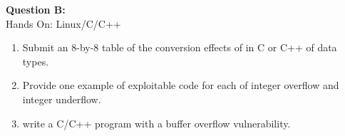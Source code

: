 \documentclass[a4paper, 11pt]{article}
\newenvironment{problem}[2][Question]
               { \begin{mdframed}[backgroundcolor=gray!20] \textbf{#1 #2:} \\}
               {   \end{mdframed}}
\begin{document}
 \begin{problem}{B} 
   Hands On: Linux/C/C++\\

   \begin{enumerate}[label=\arabic*.]
   \item
     Submit an 8-by-8 table of the conversion effects of in C or C++ of data types.
   \item
     Provide one example of exploitable code for each of integer overflow and integer underflow. 
   \item
     write a C/C++ program with a buffer overflow vulnerability.
      
  \end{enumerate}
\end{problem}
\end{document}
